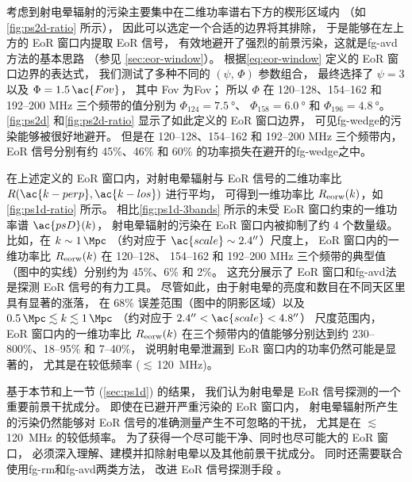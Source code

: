 考虑到射电晕辐射的污染主要集中在二维功率谱右下方的楔形区域内
（如\autoref{fig:ps2d-ratio} 所示），
因此可以选定一个合适的边界将其排除，
于是能够在左上方的 EoR 窗口内提取 EoR 信号，
有效地避开了强烈的前景污染，这就是\ac{fg-avd}方法的基本思路
（参见 \autoref{sec:eor-window}）。
根据\autoref{eq:eor-window} 定义的 EoR 窗口边界的表达式，
我们测试了多种不同的 $(\psi,\, \Phi)$ 参数组合，
最终选择了 $\psi = 3$ 以及 $\Phi = 1.5\,\ac{Fov}$，
其中 \ac{Fov} 为\acl{Fov}；
所以 $\Phi$ 在 \numrange{120}{128}、\numrange{154}{162}
和 \numrange{192}{200} \si{\MHz} 三个频带的值分别为
$\Phi_{124} = \SI{7.5}{\degree}$、
$\Phi_{158} = \SI{6.0}{\degree}$ 和
$\Phi_{196} = \SI{4.8}{\degree}$。
\autoref{fig:ps2d} 和\autoref{fig:ps2d-ratio} 显示了如此定义的 EoR 窗口边界，
可见\ac{fg-wedge}的污染能够被很好地避开。
但是在 \numrange{120}{128}、\numrange{154}{162}
和 \numrange{192}{200} \si{\MHz} 三个频带内，
EoR 信号分别有约 45\%、46\% 和 60\% 的功率损失在避开的\ac{fg-wedge}之中。

在上述定义的 EoR 窗口内，对射电晕辐射与 EoR 信号的二维功率比
$R(\ac{k-perp}, \ac{k-los})$ 进行平均，
可得到一维功率比 $R_{\mathrm{eorw}}(k)$，如\autoref{fig:ps1d-ratio} 所示。
相比\autoref{fig:ps1d-3bands} 所示的未受 EoR 窗口约束的一维功率谱 $\ac{psD}(k)$，
射电晕辐射的污染在 EoR 窗口内被抑制了约 4 个数量级。
比如，在 $k \sim \SI{1}{\per\Mpc}$
（约对应于 $\ac{scale} \sim \SI{2.4}{\arcsecond}$）尺度上，
EoR 窗口内的一维功率比 $R_{\mathrm{eorw}}(k)$ 在 \numrange{120}{128}、
\numrange{154}{162} 和 \numrange{192}{200} \si{\MHz}
三个频带的典型值（图中的实线）分别约为 45\%、6\% 和 2\%。
这充分展示了 EoR 窗口和\ac{fg-avd}法是探测 EoR 信号的有力工具。
尽管如此，由于射电晕的亮度和数目在不同天区里具有显著的涨落，
在 68\% 误差范围（图中的阴影区域）以及
$\SI{0.5}{\per\Mpc} \lesssim k \lesssim \SI{1}{\per\Mpc}$
（约对应于 $\SI{2.4}{\arcsecond} < \ac{scale} < \SI{4.8}{\arcsecond}$）
尺度范围内，
EoR 窗口内的一维功率比 $R_{\mathrm{eorw}}(k)$ 在三个频带内的值能够分别达到约
\numrange{230}{800}\%、\numrange{18}{95}\% 和 \numrange{7}{40}\%，
说明射电晕泄漏到 EoR 窗口内的功率仍然可能是显著的，
尤其是在较低频率 ($\lesssim$\,\SI{120}{\MHz})。

基于本节和上一节 (\autoref{sec:ps1d}) 的结果，
我们认为射电晕是 EoR 信号探测的一个重要前景干扰成分。
即使在已避开严重污染的 EoR 窗口内，
射电晕辐射所产生的污染仍然能够对 EoR 信号的准确测量产生不可忽略的干扰，
尤其是在 $\lesssim$\,\SI{120}{\MHz} 的较低频率。
为了获得一个尽可能干净、同时也尽可能大的 EoR 窗口，
必须深入理解、建模并扣除射电晕以及其他前景干扰成分。
同时还需要联合使用\ac{fg-rm}和\ac{fg-avd}两类方法，
改进 EoR 信号探测手段 \cite{kerrigan2018}。


